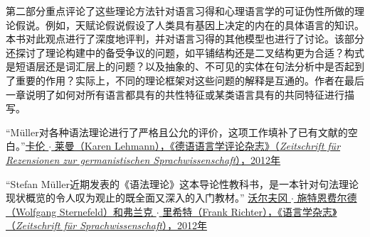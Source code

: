 {第二部分重点评论了这些理论方法针对语言习得和心理语言学的可证伪性所做的理论假说。例如，天赋论假说假设了人类具有基因上决定的内在的具体语言的知识。本书对此观点进行了深度地评判，并对语言习得的其他模型也进行了讨论。该部分还探讨了理论构建中的备受争议的问题，如平铺结构还是二叉结构更为合适？构式是短语层还是词汇层上的问题？以及抽象的、不可见的实体在句法分析中是否起到了重要的作用？实际上，不同的理论框架对这些问题的解释是互通的。作者在最后一章说明了如何对所有语言都具有的共性特征或某类语言具有的共同特征进行描写。

\smallskip

\vfill

“Müller对各种语法理论进行了严格且公允的评价，这项工作填补了已有文献的空白。”\href{http://dx.doi.org/10.1515/zrs-2012-0040}{卡伦 $\cdot$ 莱曼（Karen Lehmann），《德语语言学评论杂志》（\textit{Zeitschrift für Rezensionen zur germanistischen Sprachwissenschaft}），2012年}


\smallskip

“Stefan Müller近期发表的《语法理论》这本导论性教科书，是一本针对句法理论现状概览的令人叹为观止的既全面又深入的入门教材。” \href{http://dx.doi.org/10.1515/zfs-2012-0010}{沃尔夫冈 $\cdot$ 施特恩费尔德（Wolfgang Sternefeld）和弗兰克 $\cdot$ 里希特（Frank Richter），《语言学杂志》（\textit{Zeitschrift für Sprachwissenschaft}），2012年}


}
